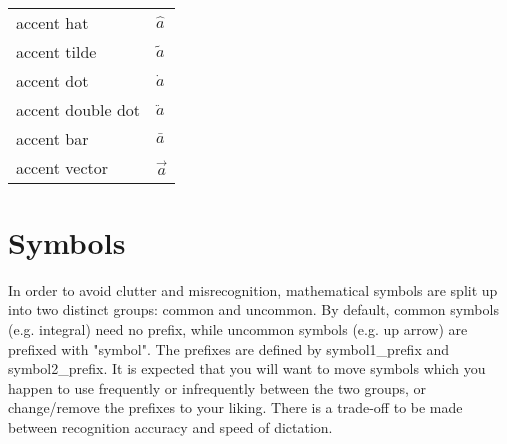 \documentclass[12pt]{article}
\begin{document}
\

\noindent
\begin{longtable}{ l l}
accent hat & $\hat{a}$ \\
accent tilde & $\tilde{a}$ \\
accent dot & $\dot{a}$ \\
accent double dot & $\ddot{a}$ \\
accent bar & $\bar{a}$ \\
accent vector & $\vec{a}$ \\
\end{longtable}


\section{Symbols}
In order to avoid clutter and misrecognition, mathematical symbols are split up into two distinct groups: common and uncommon. By default, common symbols (e.g. integral) need no prefix, while uncommon symbols (e.g. up arrow) are prefixed with "symbol". The prefixes are defined by symbol1\_prefix and symbol2\_prefix. It is expected that you will want to move symbols which you happen to use frequently or infrequently between the two groups, or change/remove the prefixes to your liking. There is a trade-off to be made between recognition accuracy and speed of dictation.
\end{document}
